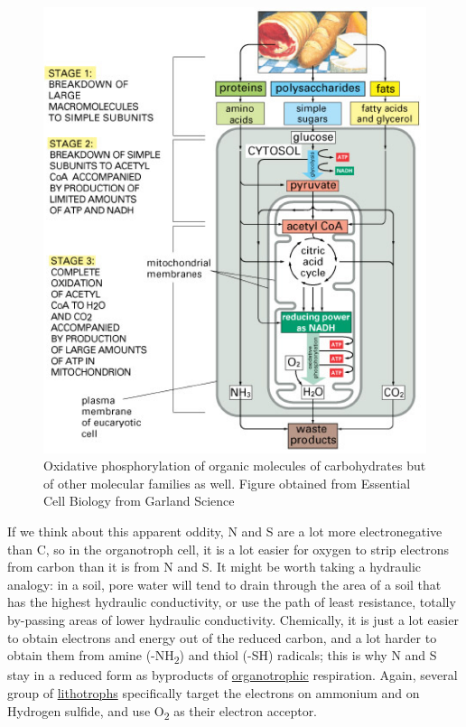 \documentclass[]{book}
\theoremstyle{definition}
\theoremstyle{definition}
\theoremstyle{definition}
\theoremstyle{remark}
\begin{document}
\begin{figure}

{\centering \includegraphics[width=0.75\linewidth]{pictures/respiration-3-OM-families} 

}

\caption{Oxidative phosphorylation of organic molecules of carbohydrates but of other molecular families as well. Figure obtained from Essential Cell Biology from Garland Science}\label{fig:respiration-OM}
\end{figure}

If we think about this apparent oddity, N and S are a lot more
electronegative than C, so in the organotroph cell, it is a lot easier
for oxygen to strip electrons from carbon than it is from N and S. It
might be worth taking a hydraulic analogy: in a soil, pore water will
tend to drain through the area of a soil that has the highest hydraulic
conductivity, or use the path of least resistance, totally by-passing
areas of lower hydraulic conductivity. Chemically, it is just a lot
easier to obtain electrons and energy out of the reduced carbon, and a
lot harder to obtain them from amine (-NH\textsubscript{2}) and thiol
(-SH) radicals; this is why N and S stay in a reduced form as byproducts
of \protect\hyperlink{trophic-names}{organotrophic} respiration. Again,
several group of \protect\hyperlink{trophic-names}{lithotrophs}
specifically target the electrons on ammonium and on Hydrogen sulfide,
and use O\textsubscript{2} as their electron acceptor.
\end{document}
